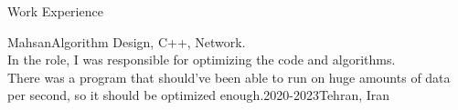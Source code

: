 
\begin{section}{Work Experience}{
    \begin{subsectionnobullet}{Mahsan}{Algorithm Design, C++, Network.\\ In the role, I was responsible for optimizing the code and algorithms. \\ There was a program that should've been able to run on huge amounts of data per second, so it should be optimized enough.}{2020-2023}{Tehran, Iran}
    \end{subsectionnobullet}
}
\end{section}

